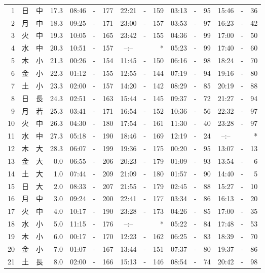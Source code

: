 \documentclass[12pt.a4j]{jsarticle}
\begin{document}
\begin{center}
\begin{table}[ht]
\begin{tabular}{|rc|cr|ccrccr|ccrccr|}
\hline
 1 & 日 & 中 & 17.3 & 08:46 &-& 177 & 22:21 &-& 159 & 03:13 &-&  95 & 15:46 &-&  36 \\
 2 & 月 & 中 & 18.3 & 09:25 &-& 171 & 23:00 &-& 157 & 03:53 &-&  97 & 16:23 &-&  42 \\
 3 & 火 & 中 & 19.3 & 10:05 &-& 165 & 23:42 &-& 155 & 04:36 &-&  99 & 17:00 &-&  50 \\
 4 & 水 & 中 & 20.3 & 10:51 &-& 157 & --:-- & &  *  & 05:23 &-&  99 & 17:40 &-&  60 \\
 5 & 木 & 小 & 21.3 & 00:26 &-& 154 & 11:45 &-& 150 & 06:16 &-&  98 & 18:24 &-&  70 \\
 6 & 金 & 小 & 22.3 & 01:12 &-& 155 & 12:55 &-& 144 & 07:19 &-&  94 & 19:16 &-&  80 \\
 7 & 土 & 小 & 23.3 & 02:00 &-& 157 & 14:20 &-& 142 & 08:29 &-&  85 & 20:19 &-&  88 \\
 8 & 日 & 長 & 24.3 & 02:51 &-& 163 & 15:44 &-& 145 & 09:37 &-&  72 & 21:27 &-&  94 \\
 9 & 月 & 若 & 25.3 & 03:41 &-& 171 & 16:54 &-& 152 & 10:36 &-&  56 & 22:32 &-&  97 \\
10 & 火 & 中 & 26.3 & 04:30 &-& 180 & 17:54 &-& 161 & 11:30 &-&  40 & 23:28 &-&  97 \\
11 & 水 & 中 & 27.3 & 05:18 &-& 190 & 18:46 &-& 169 & 12:19 &-&  24 & --:-- & &  *  \\
12 & 木 & 大 & 28.3 & 06:07 &-& 199 & 19:36 &-& 175 & 00:20 &-&  95 & 13:07 &-&  13 \\
13 & 金 & 大 &  0.0 & 06:55 &-& 206 & 20:23 &-& 179 & 01:09 &-&  93 & 13:54 &-&   6 \\
14 & 土 & 大 &  1.0 & 07:44 &-& 209 & 21:09 &-& 180 & 01:57 &-&  90 & 14:40 &-&   5 \\
15 & 日 & 大 &  2.0 & 08:33 &-& 207 & 21:55 &-& 179 & 02:45 &-&  88 & 15:27 &-&  10 \\
16 & 月 & 中 &  3.0 & 09:24 &-& 200 & 22:41 &-& 177 & 03:34 &-&  86 & 16:13 &-&  20 \\
17 & 火 & 中 &  4.0 & 10:17 &-& 190 & 23:28 &-& 173 & 04:26 &-&  85 & 17:00 &-&  35 \\
18 & 水 & 小 &  5.0 & 11:15 &-& 176 & --:-- & &  *  & 05:22 &-&  84 & 17:48 &-&  53 \\
19 & 木 & 小 &  6.0 & 00:17 &-& 170 & 12:23 &-& 162 & 06:25 &-&  83 & 18:39 &-&  70 \\
20 & 金 & 小 &  7.0 & 01:07 &-& 167 & 13:44 &-& 151 & 07:37 &-&  80 & 19:37 &-&  86 \\
21 & 土 & 長 &  8.0 & 02:00 &-& 166 & 15:13 &-& 146 & 08:54 &-&  74 & 20:42 &-&  98 \\

\end{tabular}
\end{table}
\end{center}
\end{document}
